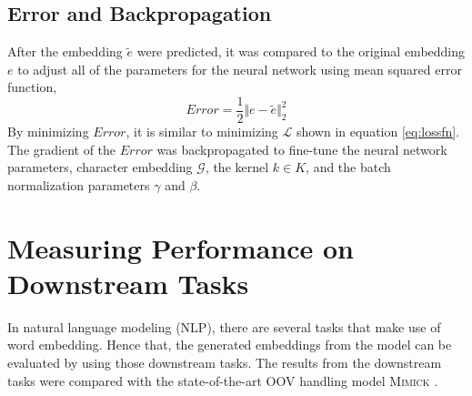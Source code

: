     \subsection{Error and Backpropagation}
        After the embedding $\tilde{e}$ were predicted, it was
        compared to the original embedding $e$ to adjust all of the
        parameters for the neural network using mean squared error
        function,
        \begin{equation}
            \label{eq:errorf}
            Error = \frac{1}{2} \Vert e - \tilde{e} \Vert ^{2}_2
        \end{equation}
        By minimizing $Error$, it is similar to minimizing
        $\mathcal{L}$ shown in equation \ref{eq:lossfn}. The gradient
        of the $Error$ was backpropagated to fine-tune the neural
        network parameters, character embedding $\mathcal{G}$, the
        kernel $k \in K$, and the batch normalization parameters
        $\gamma$ and $\beta$.
        
\section{Measuring Performance on Downstream Tasks}
    In natural language modeling (NLP), there are several tasks that
    make use of word embedding. Hence that, the generated embeddings
    from the model can be evaluated by using those downstream tasks.
    The results from the downstream tasks were compared with the
    state-of-the-art OOV handling model \textsc{Mimick}
    \citep{mimicking2017Pinter}.
    

